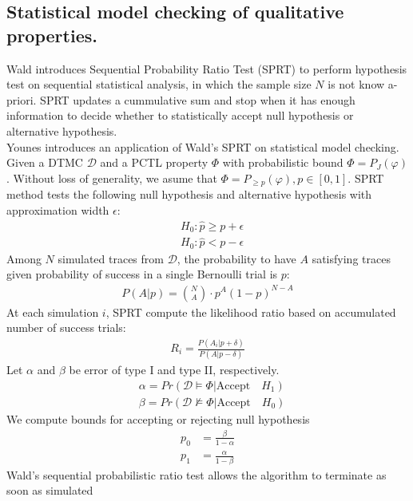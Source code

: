 \subsection{Statistical model checking of qualitative properties.}
Wald \cite{wald1945sequential} introduces Sequential Probability Ratio Test (SPRT) to perform
hypothesis test on sequential statistical analysis, in which the sample size $N$ is not know
a-priori. SPRT updates a cummulative sum and stop when it has enough information to decide whether
to statistically accept null hypothesis or alternative hypothesis.\\
Younes \cite{younes2002probabilistic} introduces an application of Wald's SPRT on statistical model
checking. Given a DTMC $\mathcal{D}$ and a PCTL property $\Phi$ with probabilistic bound $\Phi =
      P_J(\varphi)$. Without loss of generality, we asume that $\Phi = P_{\geq p}(\varphi),
      p\in[0,1]$. SPRT method tests the following null hypothesis and alternative hypothesis with
approximation width $\epsilon$:
\begin{align*}
       & H_0: \hat{p} \geq p + \epsilon \\
       & H_0: \hat{p} < p - \epsilon
\end{align*}
Among $N$ simulated traces from $\mathcal{D}$, the probability to have $A$ satisfying traces given
probability of success in a single Bernoulli trial is $p$:
\begin{align*}
      P(A | p) = {N \choose A} \cdot p^A(1-p)^{N-A}
\end{align*}
At each simulation $i$, SPRT compute the likelihood ratio based on accumulated number of success trials:
\begin{align*}
      R_i = \frac{P(A_i | p + \delta)}{P(A | p - \delta)}
\end{align*}
Let $\alpha$ and $\beta$ be error of type I and type II, respectively.
\begin{align*}
       & \alpha = Pr(\mathcal{D} \models \Phi | \text{Accept}\quad H_1) \\
       & \beta =  Pr(\mathcal{D} \nvDash \Phi | \text{Accept}\quad H_0)
\end{align*}
We compute bounds for accepting or rejecting null hypothesis
\begin{align*}
      p_0 & = \frac{\beta}{1 - \alpha} \\
      p_1 & = \frac{\alpha}{1 - \beta}
\end{align*}
Wald's sequential probabilistic ratio test allows the algorithm to terminate as soon as simulated
